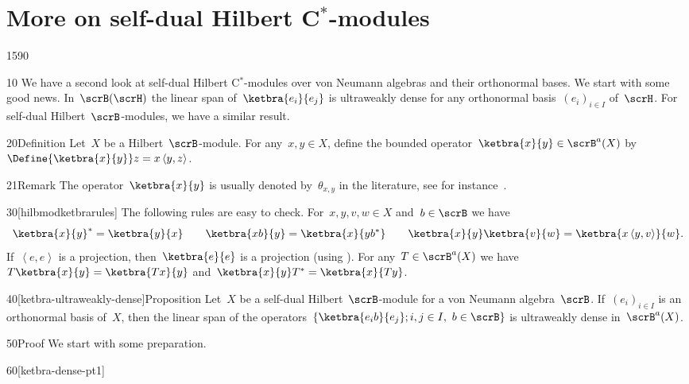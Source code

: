 \section{More on self-dual Hilbert C$^*$-modules}
\begin{parsec}{1590}%
\begin{point}{10}%
We have a second look at
    self-dual Hilbert C$^*$-modules over von Neumann algebras
    and their orthonormal bases.
We start with some good news.
In~$\scrB(\scrH)$ the linear span of~$\ketbra{e_i}{e_j}$
    is ultraweakly dense for any orthonormal basis~$(e_i)_{i \in I}$
    of~$\scrH$.
For self-dual Hilbert~$\scrB$-modules, we have a similar result.
\end{point}
\begin{point}{20}{Definition}%
Let~$X$ be a Hilbert~$\scrB$-module.
For any~$x, y \in X$,
define the bounded operator~$\ketbra{x}{y} \in \scrB^a(X)$
by~$\Define{\ketbra{x}{y}}\index{*ketbra@$\ketbra{x}{y}$ for Hilbert $\scrB$-modules} z = x \left<y,z\right>$.
\begin{point}{21}{Remark}%
The operator~$\ketbra{x}{y}$ is usually denoted by~$\theta_{x,y}$
    in the literature,
    see for instance~\cite[\S2.2]{manuilov2000hilbertc}.
\end{point}
\begin{point}{30}[hilbmodketbrarules]%
The following rules are easy to check.
For~$x,y,v,w \in X$ and~$b \in \scrB$
    we have
\begin{equation*}
\ketbra{x}{y}^* = \ketbra{y}{x} \qquad
\ketbra{xb}{y} = \ketbra{x}{yb^*} \qquad
\ketbra{x}{y} \ketbra{v}{w} = \ketbra{x\left<y,v\right>}{w}.
\end{equation*}
If~$\left<e,e\right>$ is a projection,
    then~$\ketbra{e}{e}$ is a projection
    (using ).
For any~$T \in \scrB^a(X)$
    we have~$T \ketbra{x}{y} = \ketbra{Tx}{y}$
    and~$\ketbra{x}{y}T^* = \ketbra{x}{Ty}$.
\end{point}
\end{point}
\begin{point}{40}[ketbra-ultraweakly-dense]{Proposition}%
Let~$X$ be a self-dual Hilbert~$\scrB$-module
    for a von Neumann algebra~$\scrB$.
If~$(e_i)_{i \in I}$ is an orthonormal basis of~$X$,
then the linear span of
    the operators~$\{ \ketbra{e_i b}{e_j}; i,j \in I, \ b \in \scrB\}$
    is ultraweakly dense in~$\scrB^a(X)$.
\begin{point}{50}{Proof}%
We start with some preparation.
\begin{point}{60}[ketbra-dense-pt1]%

\end{point}
\end{point}
\end{point}
\end{parsec}
